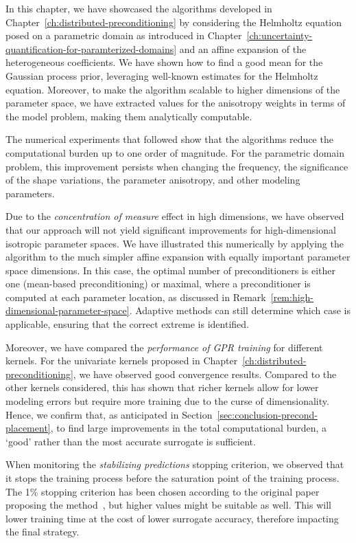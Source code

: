 In this chapter, we have showcased the algorithms developed in Chapter~\ref{ch:distributed-preconditioning} by considering the Helmholtz equation posed on a parametric domain as introduced in Chapter~\ref{ch:uncertainty-quantification-for-paramterized-domains} and an affine expansion of the heterogeneous coefficients.
We have shown how to find a good mean for the Gaussian process prior, leveraging well-known estimates for the Helmholtz equation.
Moreover, to make the algorithm scalable to higher dimensions of the parameter space, we have extracted values for the anisotropy weights in terms of the model problem, making them analytically computable.

The numerical experiments that followed show that the algorithms reduce the computational burden up to one order of magnitude.
For the parametric domain problem, this improvement persists when changing the frequency, the significance of the shape variations, the parameter anisotropy, and other modeling parameters.

Due to the \textit{concentration of measure} effect in high dimensions, we have observed that our approach will not yield significant improvements for high-dimensional isotropic parameter spaces.
We have illustrated this numerically by applying the algorithm to the much simpler affine expansion with equally important parameter space dimensions.
In this case, the optimal number of preconditioners is either one (mean-based preconditioning) or maximal, where a preconditioner is computed at each parameter location, as discussed in Remark~\ref{rem:high-dimensional-parameter-space}.
Adaptive methods can still determine which case is applicable, ensuring that the correct extreme is identified.

Moreover, we have compared the \textit{performance of GPR training} for different kernels.
For the univariate kernels proposed in Chapter~\ref{ch:distributed-preconditioning}, we have observed good convergence results.
Compared to the other kernels considered, this has shown that richer kernels allow for lower modeling errors but require more training due to the curse of dimensionality.
Hence, we confirm that, as anticipated in Section~\ref{sec:conclusion-precond-placement}, to find large improvements in the total computational burden, a `good' rather than the most accurate surrogate is sufficient.

When monitoring the \textit{stabilizing predictions} stopping criterion, we observed that it stops the training process before the saturation point of the training process.
The 1$\%$ stopping criterion has been chosen according to the original paper proposing the method~\cite{pullar-strecker2024}, but higher values might be suitable as well.
This will lower training time at the cost of lower surrogate accuracy, therefore impacting the final strategy.

